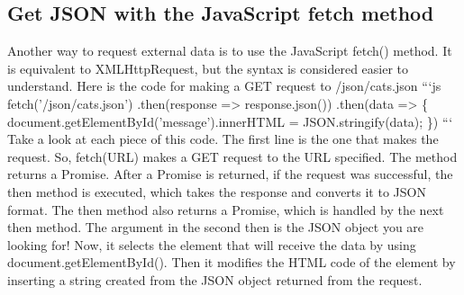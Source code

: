 \documentclass{article}%
\begin{document}
%
\subsection{Get JSON with the JavaScript fetch method}%
\label{subsec:GetJSONwiththeJavaScriptfetchmethod}%
Another way to request external data is to use the JavaScript fetch()  method. It is equivalent to XMLHttpRequest, but the syntax is considered easier to understand.\newline%
Here is the code for making a GET request to /json/cats.json\newline%
```js\newline%
fetch('/json/cats.json')\newline%
    .then(response => response.json())\newline%
    .then(data => \{\newline%
        document.getElementById('message').innerHTML = JSON.stringify(data);\newline%
    \})\newline%
```\newline%
Take a look at each piece of this code. \newline%
The first line is the one that makes the request. So, fetch(URL) makes a GET request to the URL specified. The method returns a Promise.\newline%
After a Promise is returned, if the request was successful, the then method is executed, which takes the response and converts it to JSON format.\newline%
The then method also returns a Promise, which is handled by the next then method. The argument in the second then is the JSON object you are looking for! \newline%
Now, it selects the element that will receive the data by using document.getElementById(). Then it modifies the HTML code of the element by inserting a string created from the JSON object returned from the request.\newline%

%
\end{document}
